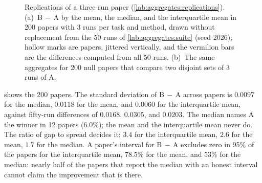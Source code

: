 \begin{refsection}
\begin{figure}[t]
\begin{fullwidth}
\centering
{}
\caption{Replications of a three-run paper (\cref{lab:aggregates:replications}). (a)~B$\,-\,$A by the mean, the median, and the interquartile mean in 200 papers with 3 runs per task and method, drawn without replacement from the 50 runs of \cref{lab:aggregates:suite} (seed 2026); hollow marks are papers, jittered vertically, and the vermilion bars are the differences computed from all 50 runs. (b)~The same aggregates for 200 null papers that compare two disjoint sets of 3 runs of A.}\label{fig:aggregates:replications}
\end{fullwidth}
\end{figure}

 shows the 200 papers. The standard deviation of B$\,-\,$A across papers is $0.0097$ for the median, $0.0118$ for the mean, and $0.0060$ for the interquartile mean, against fifty-run differences of $0.0168$, $0.0305$, and $0.0203$. The median names A the winner in 12 papers (6.0\%); the mean and the interquartile mean never do. The ratio of gap to spread decides it: $3.4$ for the interquartile mean, $2.6$ for the mean, $1.7$ for the median. A paper's interval for B$\,-\,$A excludes zero in 95\% of the papers for the interquartile mean, 78.5\% for the mean, and 53\% for the median: nearly half of the papers that report the median with an honest interval cannot claim the improvement that is there.


\end{refsection}
